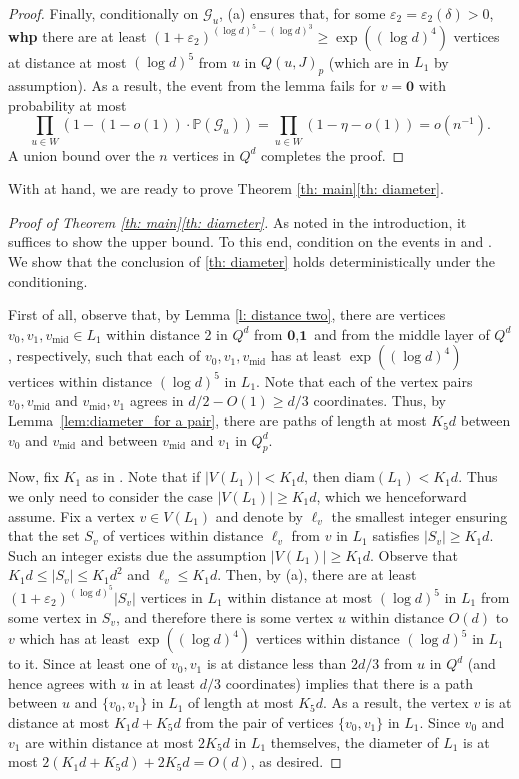 \documentclass[reqno,final,a4paper]{amsart}
\theoremstyle{definition}
\newcommand{\cG}{\mathcal{G}}
\def\eps{\varepsilon}
\newcommand{\1}{\mathbbm{1}}
\begin{document}
\begin{proof}
Finally, conditionally on $\cG_u$, (a) ensures that, for some $\eps_2=\eps_2(\delta)>0$, \textbf{whp} there are at least $(1+\eps_2)^{(\log d)^5-(\log d)^3}\ge \exp((\log d)^4)$ vertices at distance at most $(\log d)^5$ from $u$ in $Q(u,J)_p$ (which are in $L_1$ by assumption).
As a result, the event from the lemma fails for $v=\textbf{0}$ with probability at most 
\[\prod_{u\in W} (1-(1-o(1))\cdot\mathbb P(\cG_u)) = \prod_{u\in W} (1-\eta-o(1)) = o(n^{-1}).\]
A union bound over the $n$ vertices in $Q^d$ completes the proof.
\end{proof}

With  at hand, we are ready to prove Theorem \ref{th: main}\ref{th: diameter}.
\begin{proof}[Proof of Theorem \ref{th: main}\ref{th: diameter}]
As noted in the introduction, it suffices to show the upper bound.
To this end, condition on the events in  and . We show that the conclusion of \ref{th: diameter} holds deterministically under the conditioning. 

First of all, observe that, by Lemma \ref{l: distance two}, there are vertices $v_0,v_1,v_{\mathrm{mid}}\in L_1$ within distance 2 in $Q^d$ from $\textbf{0},\textbf{1}$ and from the middle layer of $Q^d$, respectively, such that each of $v_0,v_1,v_{\mathrm{mid}}$ has at least $\exp((\log d)^4)$ vertices within distance $(\log d)^5$ in $L_1$. Note that each of the vertex pairs $v_0,v_{\mathrm{mid}}$ and $v_{\mathrm{mid}},v_1$ agrees in $d/2-O(1)\ge d/3$ coordinates.
Thus, by Lemma~\ref{lem:diameter_for a pair}, there are paths of length at most $K_5d$ between $v_0$ and $v_{\mathrm{mid}}$ and between $v_{\mathrm{mid}}$ and $v_1$ in $Q^d_p$. 

Now, fix $K_1$ as in . Note that if $|V(L_1)|<K_1d$, then $\mathrm{diam}(L_1)<K_1d$. Thus we only need to consider the case $|V(L_1)|\geq K_1d$, which we henceforward assume. Fix a vertex $v\in V(L_1)$ and denote by $\ell_v$ the smallest integer ensuring that the set $S_v$ of vertices within distance $\ell_v$ from $v$ in $L_1$ satisfies $|S_v|\ge K_1d$. Such an integer exists due the assumption  $|V(L_1)|\geq K_1d$. Observe that $K_1d\le |S_v|\le K_1d^2$ and $\ell_v\le K_1d$. 
Then, by (a), there are at least $(1+\eps_2)^{(\log d)^5}|S_v|$ vertices in $L_1$ within distance at most $(\log d)^5$ in $L_1$ from some vertex in $S_v$, and therefore there is some vertex $u$ within distance $O(d)$ to $v$ which has at least $\exp((\log d)^4)$ vertices within distance $(\log d)^5$ in $L_1$ to it. 
Since at least one of $v_0,v_1$ is at distance less than $2d/3$ from $u$ in $Q^d$ (and hence agrees with $u$ in at least $d/3$ coordinates)  implies that there is a path between $u$ and $\{v_0,v_1\}$ in $L_1$ of length at most $K_5d$.
As a result, the vertex $v$ is at distance at most $K_1d+K_5d$ from the pair of vertices $\{v_0,v_1\}$ in $L_1$.
Since $v_0$ and $v_1$ are within distance at most $2K_5d$ in $L_1$ themselves, the diameter of $L_1$ is at most $2(K_1d+K_5d)+2K_5d=O(d)$, as desired.
\end{proof}
\end{document}
